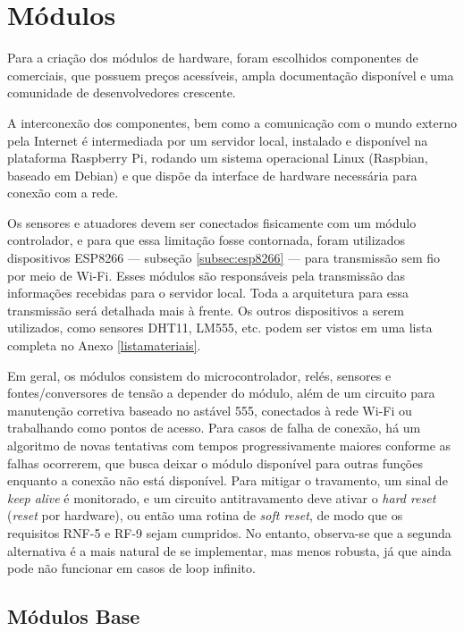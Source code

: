 \section{Módulos}
Para a criação dos módulos de hardware, foram escolhidos componentes de \wiot{} comerciais, que possuem preços acessíveis, ampla documentação disponível e uma comunidade de desenvolvedores crescente.

A interconexão dos componentes, bem como a comunicação com o mundo externo pela Internet é intermediada por um servidor local, instalado e disponível na plataforma Raspberry Pi, rodando um sistema operacional Linux (Raspbian, baseado em Debian) e que dispõe da interface de hardware necessária para conexão com a rede.

Os sensores e atuadores devem ser conectados fisicamente com um módulo controlador, e para que essa limitação fosse contornada, foram utilizados dispositivos ESP8266 --- subseção \ref{subsec:esp8266} --- para transmissão sem fio por meio de Wi-Fi. Esses módulos são responsáveis pela transmissão das informações recebidas para o servidor local. Toda a arquitetura para essa transmissão será detalhada mais à frente. Os outros dispositivos a serem utilizados, como sensores DHT11, LM555, etc. podem ser vistos em uma lista completa no Anexo \ref{listamateriais}.

Em geral, os módulos consistem do microcontrolador, relés, sensores e fontes\slash{}conversores de tensão a depender do módulo, além de um circuito para manutenção corretiva baseado no astável 555, conectados à rede Wi-Fi ou trabalhando como pontos de acesso. Para casos de falha de conexão, há um algoritmo de novas tentativas com tempos progressivamente maiores conforme as falhas ocorrerem, que busca deixar o módulo disponível para outras funções enquanto a conexão não está disponível. Para mitigar o travamento, um sinal de \textit{keep alive} é monitorado, e um circuito antitravamento deve ativar o \textit{hard reset} (\emph{reset} por hardware), ou então uma rotina de \textit{soft reset}, de modo que os requisitos RNF-5 e RF-9 sejam cumpridos. No entanto, observa-se que a segunda alternativa é a mais natural de se implementar, mas menos robusta, já que ainda pode não funcionar em casos de loop infinito.

\subsection{Módulos Base}
